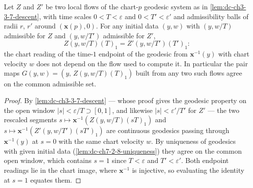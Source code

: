 \begin{lemma}
  \label{lem:dc-ch3-3-7-flow-agree}
  \leanok
  Let $Z$ and $Z'$ be two local flows of the chart-$p$ geodesic system as in
  \cref{lem:dc-ch3-3-7-descent}, with time scales $0<T<\varepsilon$ and
  $0<T'<\varepsilon'$ and admissibility balls of radii $r$, $r'$ around
  $(\mathbf{x}(p),0)$. For any initial data $(y,w)$ with $(y,w/T)$ admissible
  for $Z$ and $(y,w/T')$ admissible for $Z'$,
  $$Z(y,w/T)(T)_1=Z'(y,w/T')(T')_1:$$
  the chart reading of the time-$1$ endpoint of the geodesic from
  $\mathbf{x}^{-1}(y)$ with chart velocity $w$ does not depend on the flow
  used to compute it. In particular the pair maps
  $G(y,w)=(y,\,Z(y,w/T)(T)_1)$ built from any two such flows agree on the
  common admissible set.
\end{lemma}
\begin{proof}
  \sketch
  \leanok
  By \cref{lem:dc-ch3-3-7-descent} — whose proof gives the geodesic property
  on the open window $|s|<\varepsilon/T\supset[0,1]$, and likewise
  $|s|<\varepsilon'/T'$ for $Z'$ — the two rescaled segments
  $s\mapsto\mathbf{x}^{-1}(Z(y,w/T)(sT)_1)$ and
  $s\mapsto\mathbf{x}^{-1}(Z'(y,w/T')(sT')_1)$ are continuous geodesics
  passing through $\mathbf{x}^{-1}(y)$ at $s=0$ with the same chart velocity
  $w$. By uniqueness of geodesics with given initial data
  (\cref{lem:dc-ch7-2-8-uniqueness}) they agree on the common open window,
  which contains $s=1$ since $T<\varepsilon$ and $T'<\varepsilon'$. Both
  endpoint readings lie in the chart image, where $\mathbf{x}^{-1}$ is
  injective, so evaluating the identity at $s=1$ equates them.
\end{proof}

